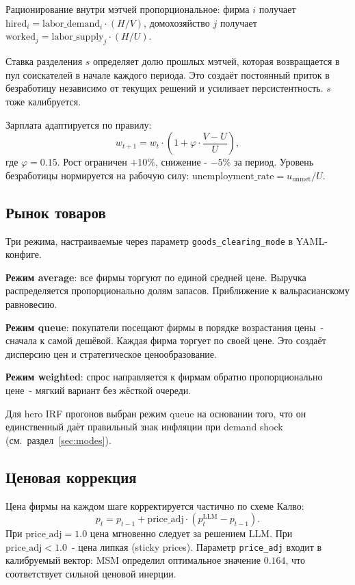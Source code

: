 \documentclass[12pt, a4paper]{article}
\begin{document}
Рационирование внутри мэтчей пропорциональное: фирма $i$ получает $\text{hired}_i = \text{labor\_demand}_i \cdot (H / V)$, домохозяйство $j$ получает $\text{worked}_j = \text{labor\_supply}_j \cdot (H / U)$.

Ставка разделения $s$ определяет долю прошлых мэтчей, которая возвращается в пул соискателей в начале каждого периода. Это создаёт постоянный приток в безработицу независимо от текущих решений и усиливает персистентность. $s$ тоже калибруется.

Зарплата адаптируется по правилу:
\begin{equation}
w_{t+1} = w_t \cdot \left(1 + \varphi \cdot \frac{V - U}{U}\right),
\end{equation}
где $\varphi = 0.15$. Рост ограничен $+10\%$, снижение - $-5\%$ за период. Уровень безработицы нормируется на рабочую силу: $\text{unemployment\_rate} = u_{\text{unmet}} / U$.

\subsection{Рынок товаров}

Три режима, настраиваемые через параметр \texttt{goods\_clearing\_mode} в YAML-конфиге.

\textbf{Режим average}: все фирмы торгуют по единой средней цене. Выручка распределяется пропорционально долям запасов. Приближение к вальрасианскому равновесию.

\textbf{Режим queue}: покупатели посещают фирмы в порядке возрастания цены~- сначала к самой дешёвой. Каждая фирма торгует по своей цене. Это создаёт дисперсию цен и стратегическое ценообразование.

\textbf{Режим weighted}: спрос направляется к фирмам обратно пропорционально цене~- мягкий вариант без жёсткой очереди.

Для hero IRF прогонов выбран режим queue на основании того, что он единственный даёт правильный знак инфляции при demand shock (см.\ раздел~\ref{sec:modes}).

\subsection{Ценовая коррекция}

Цена фирмы на каждом шаге корректируется частично по схеме Калво:
\begin{equation}
p_t = p_{t-1} + \text{price\_adj} \cdot (p^{\text{LLM}}_t - p_{t-1}).
\end{equation}
При $\text{price\_adj} = 1.0$ цена мгновенно следует за решением LLM. При $\text{price\_adj} < 1.0$~- цена липкая (sticky prices). Параметр \texttt{price\_adj} входит в калибруемый вектор: MSM определил оптимальное значение $0.164$, что соответствует сильной ценовой инерции.
\end{document}
